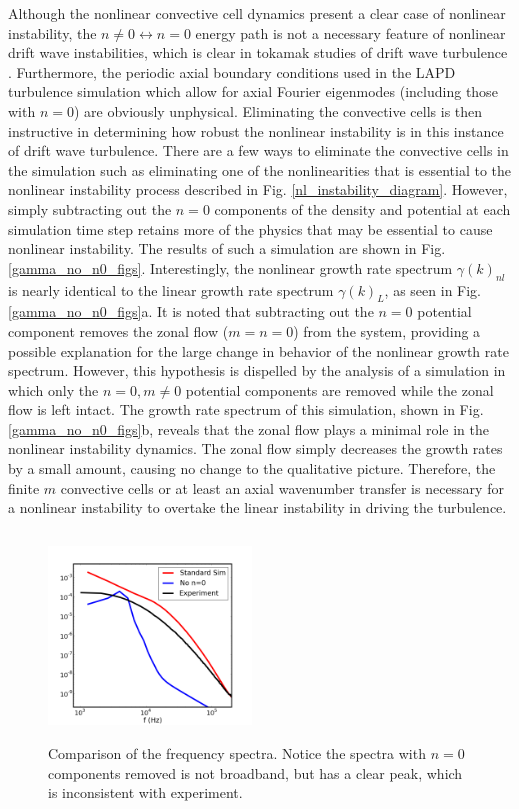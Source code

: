 \documentclass[12pt]{article}
\begin{document}
Although the nonlinear convective cell dynamics present a clear case of nonlinear instability, the $n \ne 0 \leftrightarrow n=0$ energy path is not a necessary feature of nonlinear drift wave
instabilities, which is clear in tokamak studies of drift wave turbulence \cite{zeiler1996,zeiler1997,scott2002,scott2003,scott2005}. Furthermore, the periodic axial boundary conditions
used in the LAPD turbulence simulation which allow for axial Fourier eigenmodes (including those with $n=0$) are obviously unphysical. Eliminating the convective cells is then instructive
in determining how robust the nonlinear instability is in this instance of drift wave turbulence. There are a few ways to eliminate the convective cells in the simulation such as
eliminating one of the nonlinearities that is essential to the nonlinear instability process described in Fig. \ref{nl_instability_diagram}. However, simply subtracting out the $n=0$
components of the density and potential at each simulation time step retains more of the physics that may be essential to cause nonlinear instability. The results of such a simulation
are shown in Fig. \ref{gamma_no_n0_figs}. Interestingly, the nonlinear growth rate spectrum $\gamma(k)_{nl}$ is nearly identical to the linear growth rate spectrum $\gamma(k)_L$, as seen in
Fig. \ref{gamma_no_n0_figs}a. It is noted that subtracting out the $n=0$ potential component removes the zonal flow ($m=n=0$) from the system, providing a possible explanation for the large change
in behavior of the nonlinear growth rate spectrum. However, this hypothesis is dispelled by the analysis of a simulation in which only the $n=0, m \ne 0$ potential components are removed while 
the zonal flow is left intact. The growth rate spectrum of this simulation, shown in Fig. \ref{gamma_no_n0_figs}b, reveals that the zonal flow plays a minimal role in the nonlinear instability
dynamics. The zonal flow simply decreases the growth rates by a small amount, causing no change to the qualitative picture. Therefore, the finite $m$ convective cells or at least an axial
wavenumber transfer is necessary for a nonlinear instability to overtake the linear instability in driving the turbulence. \\

\begin{figure}
\includegraphics[width=0.48\textwidth,height=55mm]{fspec_3}
\hfil
\caption{Comparison of the frequency spectra. Notice the spectra with $n=0$ components removed is not broadband, but has a clear peak, which is inconsistent with experiment.}
\label{freq_spectra3}
\end{figure}
\end{document}
